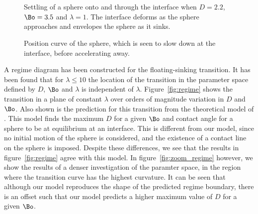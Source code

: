 {\begin{figure}
      \begin{subfigure}[b]{0.45\textwidth}
        \resizebox{\textwidth}{!}{\Large }
        \caption{}
        \label{fig:sinking_frame3}
      \end{subfigure}
      ~
      \begin{subfigure}[b]{0.45\textwidth}
        \resizebox{\textwidth}{!}{\Large }
        \caption{}
        \label{fig:sinking_frame4}
      \end{subfigure}
      
      \begin{subfigure}[b]{0.45\textwidth}
        \resizebox{\textwidth}{!}{\Large }
        \caption{}
        \label{fig:sinking_frame5}
      \end{subfigure}
      ~
      \begin{subfigure}[b]{0.45\textwidth}
        \resizebox{\textwidth}{!}{\large }
        \caption{}
        \label{fig:sinking_frame6}
      \end{subfigure}
      \caption{Settling of a sphere onto and through the interface when $D = 2.2$, $\Bo = 3.5$ and $\lambda = 1$. The interface deforms as the sphere approaches and envelopes the sphere as it sinks.}\label{fig:sinking_frame}
    \end{figure}

  \begin{figure}
    \resizebox{0.9\textwidth}{!}{\Large }
    \caption{Position curve of the sphere, which is seen to slow down at the interface, before accelerating away.\label{fig:sinking_traj}}
  \end{figure}

A regime diagram has been constructed for the floating-sinking transition. It has been found that for $\lambda \leq 10$ the location of the transition in the parameter space defined by $D$, $\Bo$ and $\lambda$ is independent of $\lambda$. Figure~\ref{fig:regime} shows the transition in a plane of constant $\lambda$ over orders of magnitude variation in $D$ and $\Bo$. Also shown is the prediction for this transition from the theoretical model of \citep{Vella06}. This model finds the maximum $D$ for a given $\Bo$ and contact angle for a sphere to be at equilibrium at an interface. This is different from our model, since no initial motion of the sphere is considered, and the existence of a contact line on the sphere is imposed. Despite these differences, we see that the results in figure~\ref{fig:regime} agree with this model. In figure~\ref{fig:zoom_regime} however, we show the results of a denser investigation of the paramter space, in the region where the transition curve has the highest curvature. It can be seen that although our model reproduces the shape of the predicted regime boundary, there is an offset such that our model predicts a higher maximum value of $D$ for a given $\Bo$.

}

